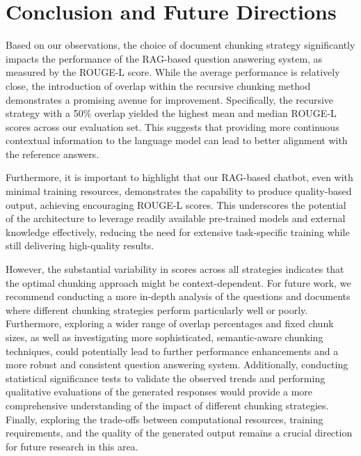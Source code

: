 \documentclass{article}
\begin{document}
\section{Conclusion and Future Directions}

Based on our observations, the choice of document chunking strategy significantly impacts the performance of the RAG-based question answering system, as measured by the ROUGE-L score. While the average performance is relatively close, the introduction of overlap within the recursive chunking method demonstrates a promising avenue for improvement. Specifically, the recursive strategy with a 50\% overlap yielded the highest mean and median ROUGE-L scores across our evaluation set. This suggests that providing more continuous contextual information to the language model can lead to better alignment with the reference answers.

Furthermore, it is important to highlight that our RAG-based chatbot, even with minimal training resources, demonstrates the capability to produce quality-based output, achieving encouraging ROUGE-L scores. This underscores the potential of the architecture to leverage readily available pre-trained models and external knowledge effectively, reducing the need for extensive task-specific training while still delivering high-quality results.

However, the substantial variability in scores across all strategies indicates that the optimal chunking approach might be context-dependent. For future work, we recommend conducting a more in-depth analysis of the questions and documents where different chunking strategies perform particularly well or poorly. Furthermore, exploring a wider range of overlap percentages and fixed chunk sizes, as well as investigating more sophisticated, semantic-aware chunking techniques, could potentially lead to further performance enhancements and a more robust and consistent question answering system. Additionally, conducting statistical significance tests to validate the observed trends and performing qualitative evaluations of the generated responses would provide a more comprehensive understanding of the impact of different chunking strategies. Finally, exploring the trade-offs between computational resources, training requirements, and the quality of the generated output remains a crucial direction for future research in this area.



\end{document}
